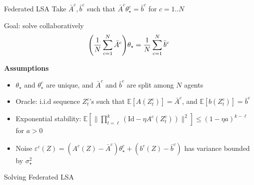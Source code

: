 \documentclass[aspectratio=169,14pt]{beamer}
\begin{document}
\begin{frame}{Federated LSA}
  Take $\bar{A}^c, \bar{b}^c$ such that $\bar{A}^c \theta_\star^c = \bar{b}^c$ for $c = 1 .. N$

  \pause
  
  Goal: solve collaboratively
  \begin{equation}
    \small
    \nonumber
    \Bigg( \frac{1}{N} \sum_{c=1}^{N} \bar{A}^c \Bigg) \theta_\star
    = 
    \frac{1}{N} \sum_{c=1}^{N} \bar{b}^c
  \end{equation}
  \vspace{-1em}

  \pause
  
  \textbf{Assumptions}

  \vspace{-0.5em}
  
  \begin{itemize}\setlength{\itemindent}{-1em}
    \small
  \item $\theta_\star$ and $\theta_\star^c$ are unique, and $\bar{A}^c$ and $\bar{b}^c$ are split among $N$ agents
    
  \item Oracle: i.i.d sequence $Z_{t}^c$'s such that
    $\mathbb{E} [A(Z_{t}^c)] = \bar{A}^c$, and
    $\mathbb{E} [b(Z_{t}^c)] = \bar{b}^c$
    
  \item Exponential stability: $\mathbb{E}[ \| \prod_{t=\ell}^k (\text{Id} - \eta A^c(Z_t^c)) \|^2 ] \le (1 - \eta a)^{k-\ell}$ for $a > 0$

  \item Noise $\varepsilon^c(Z) = (A^c(Z) - \bar{A}^c) \theta_\star^c + (b^c(Z) - \bar{b}^c)$ has variance bounded by $\sigma_\star^2$
  \end{itemize}

\end{frame}


\begin{frame}
  \vspace{6em}

  \begin{center}
    \textcolor{beamer@blendedblue}{
      \huge Solving Federated LSA
    }
  \end{center}

  \vspace{3em}
  

  \small
\end{frame}
\end{document}
